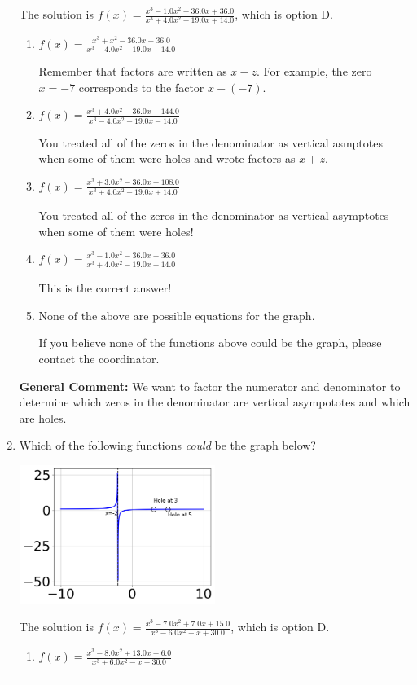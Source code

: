 \documentclass{extbook}[14pt]
\newcommand{\litem}[1]{\item #1

\rule{\textwidth}{0.4pt}}
\begin{document}
\begin{enumerate}
{The solution is \( f(x)=\frac{x^{3} -1.0 x^{2} -36.0 x + 36.0}{x^{3} +4.0 x^{2} -19.0 x + 14.0} \), which is option D.\begin{enumerate}[label=\Alph*.]
\item \( f(x)=\frac{x^{3} + x^{2} -36.0 x -36.0}{x^{3} -4.0 x^{2} -19.0 x -14.0} \)

Remember that factors are written as $x-z$. For example, the zero $x=-7$ corresponds to the factor $x-(-7)$.
\item \( f(x)=\frac{x^{3} +4.0 x^{2} -36.0 x -144.0}{x^{3} -4.0 x^{2} -19.0 x -14.0} \)

You treated all of the zeros in the denominator as vertical asmptotes when some of them were holes and wrote factors as $x+z$.
\item \( f(x)=\frac{x^{3} +3.0 x^{2} -36.0 x -108.0}{x^{3} +4.0 x^{2} -19.0 x + 14.0} \)

You treated all of the zeros in the denominator as vertical asymptotes when some of them were holes!
\item \( f(x)=\frac{x^{3} -1.0 x^{2} -36.0 x + 36.0}{x^{3} +4.0 x^{2} -19.0 x + 14.0} \)

This is the correct answer!
\item \( \text{None of the above are possible equations for the graph.} \)

If you believe none of the functions above could be the graph, please contact the coordinator.
\end{enumerate}

\textbf{General Comment:} We want to factor the numerator and denominator to determine which zeros in the denominator are vertical asympototes and which are holes.
}
\litem{
Which of the following functions \textit{could} be the graph below?

\begin{center}
    \includegraphics[width=0.5\textwidth]{../Figures/identifyGraphOfRationalFunctionA.png}
\end{center}


The solution is \( f(x)=\frac{x^{3} -7.0 x^{2} +7.0 x + 15.0}{x^{3} -6.0 x^{2} -x + 30.0} \), which is option D.\begin{enumerate}[label=\Alph*.]
\item \( f(x)=\frac{x^{3} -8.0 x^{2} +13.0 x -6.0}{x^{3} +6.0 x^{2} -x -30.0} \)


\end{enumerate}}
\end{enumerate}
\end{document}
